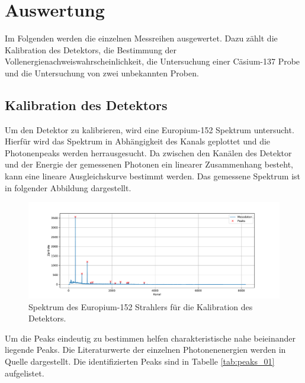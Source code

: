\section{Auswertung}
\label{sec:Auswertung}
Im Folgenden werden die einzelnen Messreihen ausgewertet. Dazu zählt die Kalibration des Detektors, die Bestimmung der Vollenergienachweiswahrscheinlichkeit,
die Untersuchung einer Cäsium-137 Probe und die Untersuchung von zwei unbekannten Proben.
\subsection{Kalibration des Detektors}
Um den Detektor zu kalibrieren, wird eine Europium-152 Spektrum untersucht. Hierfür wird das Spektrum in Abhängigkeit des 
Kanals geplottet und die Photonenpeaks werden herrausgesucht. Da zwischen den Kanälen des Detektor und der Energie 
der gemessenen Photonen ein linearer Zusammenhang besteht, kann eine lineare Ausgleichskurve bestimmt werden.
Das gemessene Spektrum ist in folgender Abbildung dargestellt.
\FloatBarrier
\begin{figure}
  \centering
  \includegraphics[width = \textwidth,keepaspectratio]{figure/Peaks_01.pdf}
  \caption{Spektrum des Europium-152 Strahlers für die Kalibration des Detektors.}
  \label{fig:Peaks_01}
\end{figure}
\FloatBarrier
Um die Peaks eindeutig zu bestimmen helfen charakteristische nahe beieinander liegende Peaks.
Die Literaturwerte der einzelnen Photonenenergien werden in Quelle \cite{Gamma_lit} dargestellt.
Die identifizierten Peaks sind in Tabelle \ref{tab:peaks_01} aufgelistet.
\FloatBarrier
